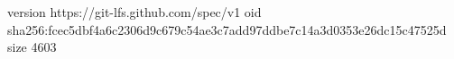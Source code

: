 version https://git-lfs.github.com/spec/v1
oid sha256:fcec5dbf4a6c2306d9c679c54ae3c7add97ddbe7c14a3d0353e26dc15c47525d
size 4603
